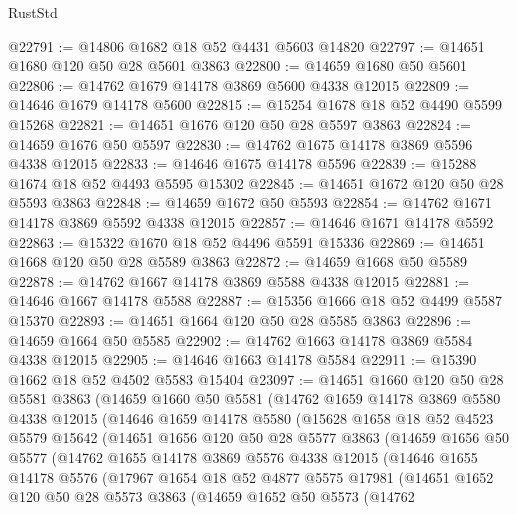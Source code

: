 \begin{lexlean}{RustStd}
\begin{coremodule}
@22791 := @14806 @1682 @18 @52 @4431 @5603 @14820
@22797 := @14651 @1680 @120 @50 @28 @5601 @3863
@22800 := @14659 @1680 @50 @5601
@22806 := @14762 @1679 @14178 @3869 @5600 @4338 @12015
@22809 := @14646 @1679 @14178 @5600
@22815 := @15254 @1678 @18 @52 @4490 @5599 @15268
@22821 := @14651 @1676 @120 @50 @28 @5597 @3863
@22824 := @14659 @1676 @50 @5597
@22830 := @14762 @1675 @14178 @3869 @5596 @4338 @12015
@22833 := @14646 @1675 @14178 @5596
@22839 := @15288 @1674 @18 @52 @4493 @5595 @15302
@22845 := @14651 @1672 @120 @50 @28 @5593 @3863
@22848 := @14659 @1672 @50 @5593
@22854 := @14762 @1671 @14178 @3869 @5592 @4338 @12015
@22857 := @14646 @1671 @14178 @5592
@22863 := @15322 @1670 @18 @52 @4496 @5591 @15336
@22869 := @14651 @1668 @120 @50 @28 @5589 @3863
@22872 := @14659 @1668 @50 @5589
@22878 := @14762 @1667 @14178 @3869 @5588 @4338 @12015
@22881 := @14646 @1667 @14178 @5588
@22887 := @15356 @1666 @18 @52 @4499 @5587 @15370
@22893 := @14651 @1664 @120 @50 @28 @5585 @3863
@22896 := @14659 @1664 @50 @5585
@22902 := @14762 @1663 @14178 @3869 @5584 @4338 @12015
@22905 := @14646 @1663 @14178 @5584
@22911 := @15390 @1662 @18 @52 @4502 @5583 @15404
@23097 := @14651
    @1660
    @120
    @50
    @28
    @5581
    @3863
    (@14659
      @1660
      @50
      @5581
      (@14762
        @1659
        @14178
        @3869
        @5580
        @4338
        @12015
        (@14646
          @1659
          @14178
          @5580
          (@15628
            @1658
            @18
            @52
            @4523
            @5579
            @15642
            (@14651
              @1656
              @120
              @50
              @28
              @5577
              @3863
              (@14659
                @1656
                @50
                @5577
                (@14762
                  @1655
                  @14178
                  @3869
                  @5576
                  @4338
                  @12015
                  (@14646
                    @1655
                    @14178
                    @5576
                    (@17967
                      @1654
                      @18
                      @52
                      @4877
                      @5575
                      @17981
                      (@14651
                        @1652
                        @120
                        @50
                        @28
                        @5573
                        @3863
                        (@14659
                          @1652
                          @50
                          @5573
                          (@14762

\end{coremodule}
\end{lexlean}
